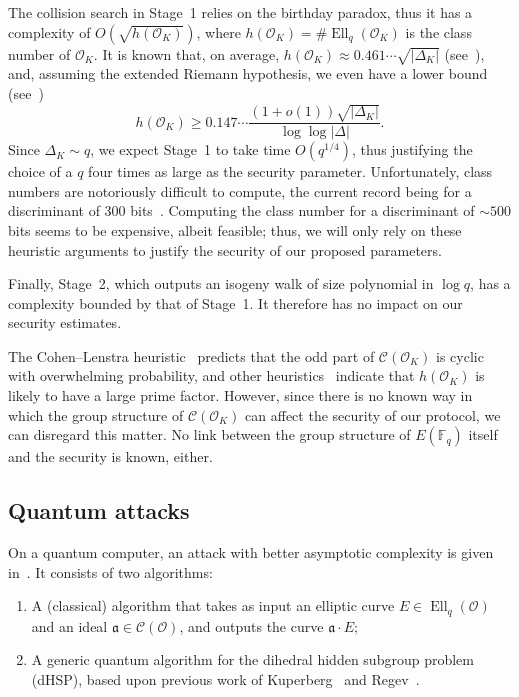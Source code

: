 \documentclass{llncs}
\newcommand{\F}{\mathbb{F}}
\newcommand{\Cl}{\mathcal{C}}
\renewcommand{\O}{\mathcal{O}}
\renewcommand{\frak}{\mathfrak}
\DeclareMathOperator{\Ell}{Ell}
\begin{document}
The collision search in Stage~1 relies on the birthday paradox, thus
it has a complexity of $O(\sqrt{h(\O_K)})$, where $h(\O_K)=\#\Ell_q(\O_K)$ is the
class number of $\O_K$.  It is known that, on average,
$h(\O_K)≈0.461\cdots\sqrt{|Δ_K|}$ (see~\cite[5.10]{Cohen1993}), and,
assuming the extended Riemann hypothesis, we even have a lower bound
(see~\cite{littlewood1928class})
\[h(\O_K) ≥ 0.147\cdots\frac{(1+o(1))\sqrt{|Δ_K|}}{\log\log|Δ|}.\]
Since $Δ_K\sim q$, we expect Stage~1 to take time $O(q^{1/4})$,
thus justifying the choice of a $q$ four times as large as the
security parameter.  Unfortunately, class numbers are notoriously
difficult to compute, the current record being
for a discriminant of 300 bits~\cite{10.1007/978-3-642-14081-5_15}.
Computing the class
number for a discriminant of ${\sim 500}$ bits seems to be expensive,
albeit feasible; thus, we will only rely on these heuristic arguments
to justify the security of our proposed parameters.

Finally, Stage~2,
which outputs an isogeny walk of size polynomial in $\log q$,
has a complexity bounded by that of Stage~1.
It therefore has no impact on our security estimates.

\begin{remark}
  The Cohen--Lenstra heuristic~\cite{10.1007/BFb0099440} predicts that
  the odd part of $\Cl(\O_K)$ is cyclic with overwhelming
  probability, and other heuristics~\cite{10.1007/3-540-44448-3_18}
  indicate that $h(\O_K)$ is likely to have a large prime factor.
  However, since there is no known way in which the group structure of
  $\Cl(\O_K)$ can affect the security of our protocol, we can 
  disregard this matter. No link between the group structure
	of $E(\F_q)$ itself and the security is known, either.
\end{remark}

\subsection{Quantum attacks}
\label{sec:quantum-attacks}

On a quantum computer, an attack with better asymptotic complexity is
given in~\cite{childs2014constructing}. It consists of two algorithms:
\begin{enumerate}
\item A (classical) algorithm that takes as input an elliptic curve
  $E∈\Ell_q(\O)$ and an ideal $\frak a∈\Cl(\O)$, and outputs the curve
  $\frak a·E$;
\item A generic quantum algorithm for the dihedral hidden subgroup
  problem (dHSP), based upon previous work of Kuperberg~\cite{Kup} and
  Regev~\cite{regev04}.
\end{enumerate}
\end{document}
